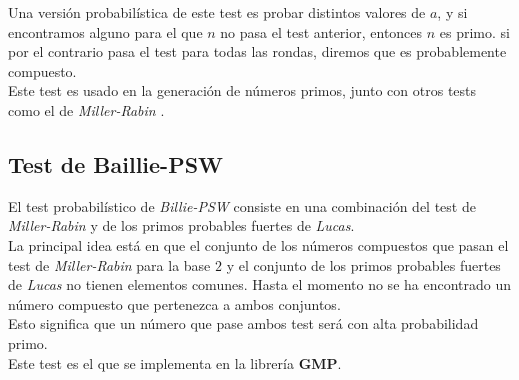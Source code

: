 Una versión probabilística de este test es probar distintos valores de $a$, y si encontramos alguno para el que $n$ no pasa el test anterior, entonces $n$ es primo. si por el contrario pasa el test para todas las rondas, diremos que es probablemente compuesto.\\

Este test es usado en la generación de números primos, junto con otros tests como el de \textit{Miller-Rabin} \cite{digital_signature_standard}.

\subsection{Test de Baillie-PSW}

El test probabilístico de \textit{Billie-PSW} consiste en una combinación del test de \textit{Miller-Rabin} y de los primos probables fuertes de \textit{Lucas}.\\

La principal idea está en que el conjunto de los números compuestos que pasan el test de \textit{Miller-Rabin} para la base $2$ y el conjunto de los primos probables fuertes de \textit{Lucas} no tienen elementos comunes. Hasta el momento no se ha encontrado un número compuesto que pertenezca a ambos conjuntos.\\

Esto significa que un número que pase ambos test será con alta probabilidad primo.\\

Este test es el que se implementa en la librería \textbf{GMP}.

\endinput
